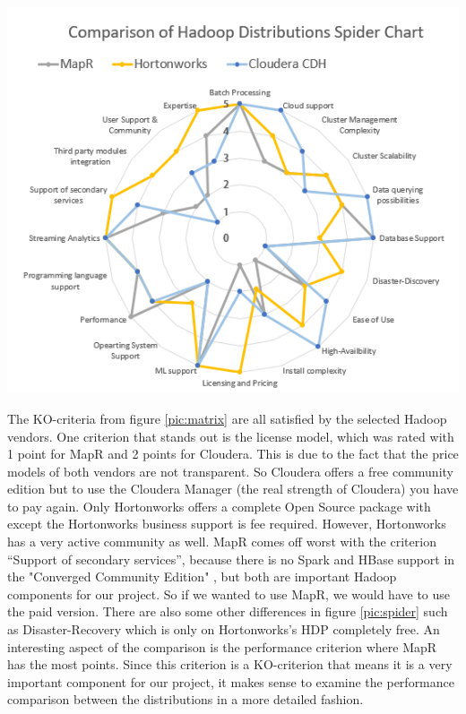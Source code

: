 \begin{center}
\includegraphics[width=1.0\textwidth]{img/spider}
\label{pic:spider}
\end{center}
The KO-criteria from figure \ref{pic:matrix} are all satisfied by the selected Hadoop vendors. One criterion that stands out is the license model, which was rated with 1 point for MapR and 2 points for Cloudera. This is due to the fact that the price models of both vendors are not transparent. So Cloudera offers a free community edition but to use the Cloudera Manager (the real strength of Cloudera) you have to pay again. Only Hortonworks offers a complete Open Source package with except the Hortonworks business support is fee required. However, Hortonworks has a very active community as well. MapR comes off worst with the criterion “Support of secondary services”, because there is no Spark and
HBase support in the "Converged Community Edition" \citep{MapR2018b}, but both are important Hadoop components for our project. So if we wanted to use MapR, we would have to use the paid version. There are also some other differences in figure \ref{pic:spider} such as Disaster-Recovery which is only on Hortonworks’s HDP completely free. An interesting aspect of the comparison is the performance criterion where MapR has the most points. Since this criterion is a KO-criterion that means it is a very important component for our project, it makes sense to examine the performance comparison between the distributions in a more detailed fashion.
